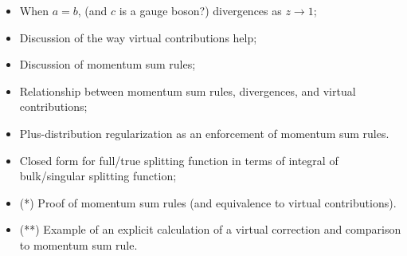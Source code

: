 




\begin{itemize}
    \item
    When \(a = b\), (and \(c\) is a gauge boson?) divergences as \(z \to 1\);

    \item
    Discussion of the way virtual contributions help;

   \item
    Discussion of momentum sum rules;

    \item
    Relationship between momentum sum rules, divergences, and virtual contributions;

    \item
    Plus-distribution regularization as an enforcement of momentum sum rules.

    \item
    Closed form for full/true splitting function in terms of integral of bulk/singular splitting function;

    \item
    (*) Proof of momentum sum rules (and equivalence to virtual contributions).

    \item
    (**) Example of an explicit calculation of a virtual correction and comparison to momentum sum rule.
\end{itemize}



